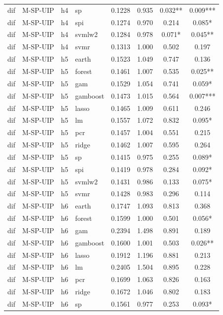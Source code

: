 \begin{ThreePartTable}
\begin{longtable}[t]{llclcccc}
dif & M-SP-UIP & h4 & sp & 0.1228 & 0.935 & 0.032** & 0.009***\\
dif & M-SP-UIP & h4 & spi & 0.1274 & 0.970 & 0.214 & 0.085*\\
dif & M-SP-UIP & h4 & svmlw2 & 0.1284 & 0.978 & 0.071* & 0.045**\\
dif & M-SP-UIP & h4 & svmr & 0.1313 & 1.000 & 0.502 & 0.197\\
\addlinespace
dif & M-SP-UIP & h5 & earth & 0.1523 & 1.049 & 0.747 & 0.136\\
dif & M-SP-UIP & h5 & forest & 0.1461 & 1.007 & 0.535 & 0.025**\\
dif & M-SP-UIP & h5 & gam & 0.1529 & 1.054 & 0.741 & 0.059*\\
dif & M-SP-UIP & h5 & gamboost & 0.1473 & 1.015 & 0.564 & 0.007***\\
dif & M-SP-UIP & h5 & lasso & 0.1465 & 1.009 & 0.611 & 0.246\\
dif & M-SP-UIP & h5 & lm & 0.1557 & 1.072 & 0.832 & 0.095*\\
dif & M-SP-UIP & h5 & pcr & 0.1457 & 1.004 & 0.551 & 0.215\\
dif & M-SP-UIP & h5 & ridge & 0.1462 & 1.007 & 0.595 & 0.264\\
dif & M-SP-UIP & h5 & sp & 0.1415 & 0.975 & 0.255 & 0.089*\\
dif & M-SP-UIP & h5 & spi & 0.1419 & 0.978 & 0.284 & 0.092*\\
dif & M-SP-UIP & h5 & svmlw2 & 0.1431 & 0.986 & 0.133 & 0.075*\\
dif & M-SP-UIP & h5 & svmr & 0.1428 & 0.983 & 0.296 & 0.114\\
\addlinespace
dif & M-SP-UIP & h6 & earth & 0.1747 & 1.093 & 0.813 & 0.368\\
dif & M-SP-UIP & h6 & forest & 0.1599 & 1.000 & 0.501 & 0.056*\\
dif & M-SP-UIP & h6 & gam & 0.2394 & 1.498 & 0.891 & 0.189\\
dif & M-SP-UIP & h6 & gamboost & 0.1600 & 1.001 & 0.503 & 0.026**\\
dif & M-SP-UIP & h6 & lasso & 0.1912 & 1.196 & 0.881 & 0.213\\
dif & M-SP-UIP & h6 & lm & 0.2405 & 1.504 & 0.895 & 0.228\\
dif & M-SP-UIP & h6 & pcr & 0.1699 & 1.063 & 0.826 & 0.163\\
dif & M-SP-UIP & h6 & ridge & 0.1672 & 1.046 & 0.802 & 0.183\\
dif & M-SP-UIP & h6 & sp & 0.1561 & 0.977 & 0.253 & 0.093*\\

\end{longtable}
\end{ThreePartTable}
